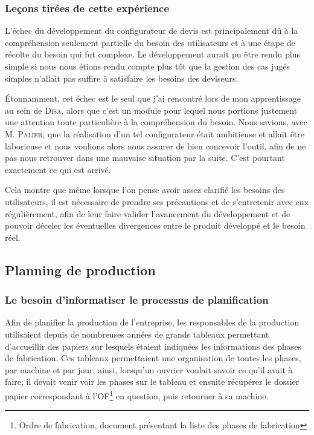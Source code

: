 \subsubsection{Leçons tirées de cette expérience}

L'échec du développement du configurateur de devis est principalement dû à la compréhension seulement partielle du besoin des utilisateurs et à une étape de récolte du besoin qui fut complexe.
Le développement aurait pu être rendu plus simple si nous nous étions rendu compte plus tôt que la gestion des cas jugés simples n'allait pas suffire à satisfaire les besoins des deviseurs.

Étonnamment, cet échec est le seul que j'ai rencontré lors de mon apprentissage au sein de \textsc{Disa}, alors que c'est un module pour lequel nous portions justement une attention toute particulière à la compréhension du besoin.
Nous savions, avec M. \textsc{Palier}, que la réalisation d'un tel configurateur était ambitieuse et allait être laborieuse et nous voulions alors nous assurer de bien concevoir l'outil, afin de ne pas nous retrouver dans une mauvaise situation par la suite.
C'est pourtant exactement ce qui est arrivé.

Cela montre que même lorsque l'on pense avoir assez clarifié les besoins des utilisateurs, il est nécessaire de prendre ses précautions et de s'entretenir avec eux régulièrement, afin de leur faire valider l'avancement du développement et de pouvoir déceler les éventuelles divergences entre le produit développé et le besoin réel.

\newpage
\subsection{Planning de production}

\subsubsection{Le besoin d'informatiser le processus de planification}

Afin de planifier la production de l'entreprise, les responsables de la production utilisaient depuis de nombreuses années de grands tableaux permettant d'accueillir des papiers sur lesquels étaient indiquées les informations des phases de fabrication.
Ces tableaux permettaient une organisation de toutes les phases, par machine et par jour, ainsi, lorsqu'un ouvrier voulait savoir ce qu'il avait à faire, il devait venir voir les phases sur le tableau et ensuite récupérer le dossier papier correspondant à l'OF\footnote{Ordre de fabrication, document présentant la liste des phases de fabrication} en question, puis retourner à sa machine.

